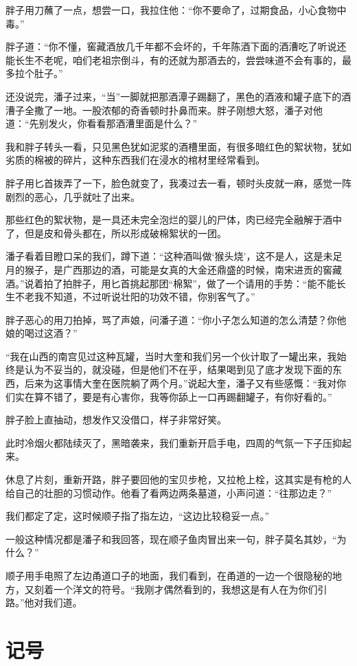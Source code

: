 胖子用刀蘸了一点，想尝一口，我拉住他：“你不要命了，过期食品，小心食物中毒。”

胖子道：“你不懂，窖藏酒放几千年都不会坏的，千年陈酒下面的酒漕吃了听说还能长生不老呢，咱们老祖宗倒斗，有的还就为那酒去的，尝尝味道不会有事的，最多拉个肚子。”

还没说完，潘子过来，“当”一脚就把那酒潭子踢翻了，黑色的酒液和罐子底下的酒漕子全撒了一地。一股浓郁的奇香顿时扑鼻而来。胖子刚想大怒，潘子对他道：“先别发火，你看看那酒漕里面是什么？”

我和胖子转头一看，只见黑色犹如泥浆的酒槽里面，有很多暗红色的絮状物，犹如劣质的棉被的碎片，这种东西我们在浸水的棺材里经常看到。

胖子用匕首拨弄了一下，脸色就变了，我凑过去一看，顿时头皮就一麻，感觉一阵剧烈的恶心，几乎就吐了出来。

那些红色的絮状物，是一具还未完全泡烂的婴儿的尸体，肉已经完全融解于酒中了，但是皮和骨头都在，所以形成破棉絮状的一团。

潘子看着目瞪口呆的我们，蹲下道：“这种酒叫做‘猴头烧’，这不是人，这是未足月的猴子，是广西那边的酒，可能是女真的大金还鼎盛的时候，南宋进贡的窖藏酒。”说着拍了拍胖子，用匕首挑起那团“棉絮”，做了一个请用的手势：“能不能长生不老我不知道，不过听说壮阳的功效不错，你别客气了。”

胖子恶心的用刀拍掉，骂了声娘，问潘子道：“你小子怎么知道的怎么清楚？你他娘的喝过这酒？”

“我在山西的南宫见过这种瓦罐，当时大奎和我们另一个伙计取了一罐出来，我始终是认为不妥当的，就没碰，但是他们不在乎，结果喝到见了底才发现下面的东西，后来为这事情大奎在医院躺了两个月。”说起大奎，潘子又有些感慨：“我对你们实在算不错了，要是有心害你，我等你舔上一口再踢翻罐子，有你好看的。”

胖子脸上直抽动，想发作又没借口，样子非常好笑。

此时冷烟火都陆续灭了，黑暗袭来，我们重新开启手电，四周的气氛一下子压抑起来。

休息了片刻，重新开路，胖子要回他的宝贝步枪，又拉枪上栓，这其实是有枪的人给自己的壮胆的习惯动作。他看了看两边两条墓道，小声问道：“往那边走？”

我们都定了定，这时候顺子指了指左边，“这边比较稳妥一点。”

一般这种情况都是潘子和我回答，现在顺子鱼肉冒出来一句，胖子莫名其妙，“为什么？”

顺子用手电照了左边甬道口子的地面，我们看到，在甬道的一边一个很隐秘的地方，又刻着一个洋文的符号。“我刚才偶然看到的，我想这是有人在为你们引路。”他对我们道。

\chapter{记号}

